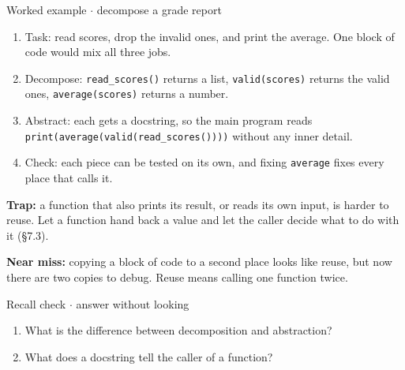 \documentclass[11pt]{article}
\begin{document}
\begin{keepsection}
\begin{workedbox}{Worked example \ensuremath{\cdot} decompose a grade report}
\begin{enumerate}
\item Task: read scores, drop the invalid ones, and print the average. One block of code would mix all three jobs.
\item Decompose: \texttt{read\_scores()} returns a list, \texttt{valid(scores)} returns the valid ones, \texttt{average(scores)} returns a number.
\item Abstract: each gets a docstring, so the main program reads \texttt{print(average(valid(read\_scores())))} without any inner detail.
\item Check: each piece can be tested on its own, and fixing \texttt{average} fixes every place that calls it.
\end{enumerate}
\end{workedbox}

\begin{notebox}\textbf{Trap:} a function that also prints its result, or reads its own input, is harder to reuse. Let a function hand back a value and let the caller decide what to do with it (§7.3).\end{notebox}

\begin{notebox}\textbf{Near miss:} copying a block of code to a second place looks like reuse, but now there are two copies to debug. Reuse means calling one function twice.\end{notebox}

\begin{recallbox}{Recall check \ensuremath{\cdot} answer without looking}
\begin{enumerate}
\item What is the difference between decomposition and abstraction?
\item What does a docstring tell the caller of a function?
\end{enumerate}

\end{recallbox}
\end{keepsection}
\end{document}
